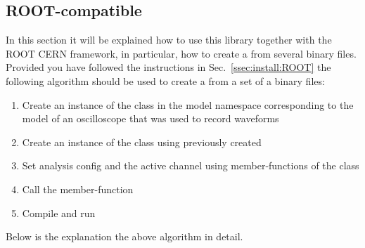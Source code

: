 \subsection{ROOT-compatible}\label{ssec:ROOT}
In this section it will be explained how to use this library together with the ROOT CERN
framework, in particular, how to create a  from several binary files. Provided
you have followed the instructions in Sec.~\ref{ssec:install:ROOT} the following algorithm
should be used to create a  from a set of a binary files:
\begin{enumerate}
    \item Create an instance of the  class in the model namespace
        corresponding to the model of an oscilloscope that was used to record waveforms
    \item Create an instance of the  class using previously created
    \item Set analysis config and the active channel using member-functions of the  class
    \item Call the  member-function
    \item Compile and run
    \label{algo:tree}
\end{enumerate}
Below is the explanation the above algorithm in detail. 

